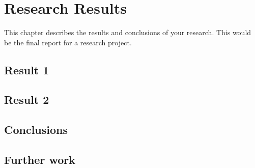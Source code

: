 
\chapter{Research Results}

This chapter describes the results and conclusions of your research.   This would be the final report for a research project.  

\section{Result 1}

\section{Result 2}

\section{Conclusions}

\section{Further work}  